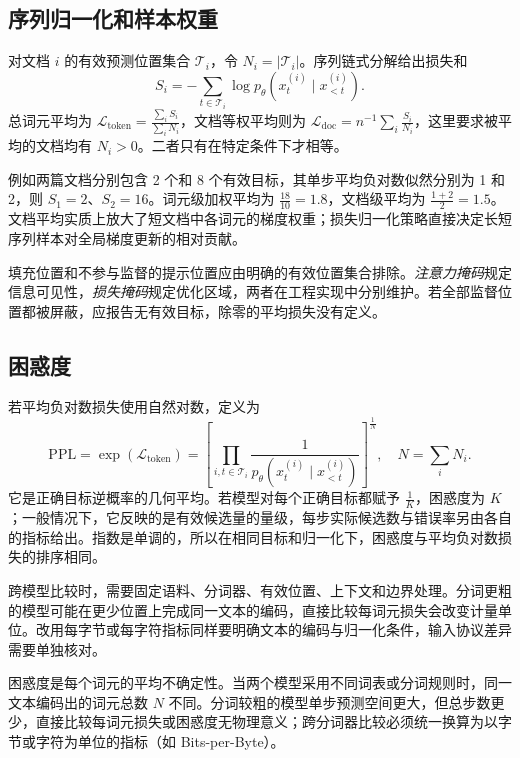 \documentclass[../textbook.tex]{subfiles}
\begin{document}
\subsection{序列归一化和样本权重}
对文档 $i$ 的有效预测位置集合 $\mathcal T_i$，令 $N_i=|\mathcal T_i|$。序列链式分解给出损失和
\begin{equation}
 S_i=-\sum_{t\in\mathcal T_i}\log p_\theta(x_t^{(i)}\mid x_{<t}^{(i)}).
\end{equation}
总词元平均为 $\mathcal L_{\mathrm{token}}=\frac{\sum_iS_i}{\sum_iN_i}$，文档等权平均则为 $\mathcal L_{\mathrm{doc}}=n^{-1}\sum_i\frac{S_i}{N_i}$，这里要求被平均的文档均有 $N_i>0$。二者只有在特定条件下才相等。

例如两篇文档分别包含 2 个和 8 个有效目标，其单步平均负对数似然分别为 1 和 2，则 $S_1=2$、$S_2=16$。词元级加权平均为 $\frac{18}{10}=1.8$，文档级平均为 $\frac{1+2}{2}=1.5$。文档平均实质上放大了短文档中各词元的梯度权重；损失归一化策略直接决定长短序列样本对全局梯度更新的相对贡献。

填充位置和不参与监督的提示位置应由明确的有效位置集合排除。\emph{注意力掩码}规定信息可见性，\emph{损失掩码}规定优化区域，两者在工程实现中分别维护。若全部监督位置都被屏蔽，应报告无有效目标，除零的平均损失没有定义。

\subsection{困惑度}
若平均负对数损失使用自然对数，定义为
\begin{equation}
 \mathrm{PPL}=\exp(\mathcal L_{\mathrm{token}})
 =\left[\prod_{i,t\in\mathcal T_i}\frac1{p_\theta(x_t^{(i)}\mid x_{<t}^{(i)})}\right]^{\frac{1}{N}},
 \quad N=\sum_iN_i.
\end{equation}
它是正确目标逆概率的几何平均。若模型对每个正确目标都赋予 $\frac{1}{K}$，困惑度为 $K$；一般情况下，它反映的是有效候选量的量级，每步实际候选数与错误率另由各自的指标给出。指数是单调的，所以在相同目标和归一化下，困惑度与平均负对数损失的排序相同。

跨模型比较时，需要固定语料、分词器、有效位置、上下文和边界处理。分词更粗的模型可能在更少位置上完成同一文本的编码，直接比较每词元损失会改变计量单位。改用每字节或每字符指标同样要明确文本的编码与归一化条件，输入协议差异需要单独核对。

\begin{warning}[跨分词器困惑度比较的口径陷阱]
困惑度是每个词元的平均不确定性。当两个模型采用不同词表或分词规则时，同一文本编码出的词元总数 $N$ 不同。分词较粗的模型单步预测空间更大，但总步数更少，直接比较每词元损失或困惑度无物理意义；跨分词器比较必须统一换算为以字节或字符为单位的指标（如 Bits-per-Byte）。
\end{warning}
\end{document}
